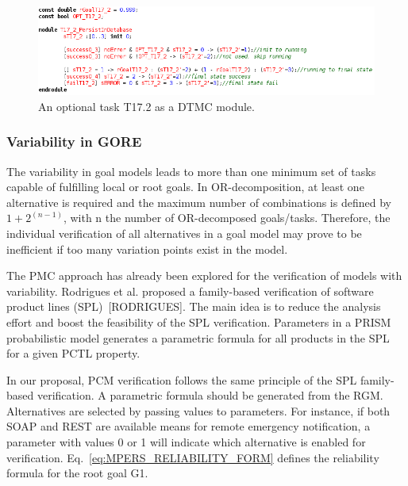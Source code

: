 \begin{figure}[ht]
\centering
\includegraphics[width=1\textwidth]{imgs/PRISM_OPT_TSK.png}
\caption{An optional task T17.2 as a DTMC module.}
\label{fig:PRISM_OPT_TSK}
\end{figure}



\subsubsection{Variability in GORE}

The variability in goal models leads to more than one minimum set of tasks capable of fulfilling local or root goals. In OR-decomposition, at least one alternative is required and the maximum number of combinations is defined by $1 + 2^{(n-1)}$, with n the number of OR-decomposed goals/tasks. Therefore, the individual verification of all alternatives in a goal model may prove to be inefficient if too many variation points exist in the model.

The PMC approach has already been explored for the verification of models with variability. Rodrigues et al. proposed a family-based verification of software product lines (SPL)~[RODRIGUES]. The main idea is to reduce the analysis effort and boost the feasibility of the SPL verification. Parameters in a PRISM probabilistic model generates a parametric formula for all products in the SPL for a given PCTL property. 

In our proposal, PCM verification follows the same principle of the SPL family-based verification. A parametric formula should be generated from the RGM. Alternatives are selected by passing values to parameters. For instance, if both SOAP and REST are available means for remote emergency notification, a parameter with values 0 or 1 will indicate which alternative is enabled for verification. Eq.~\ref{eq:MPERS_RELIABILITY_FORM} defines the reliability formula for the root goal G1.

